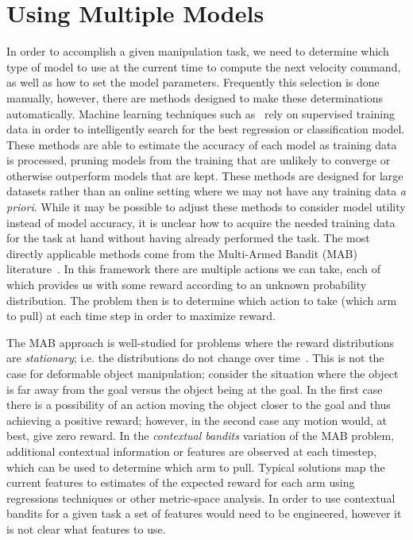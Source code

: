
\section{Using Multiple Models}

In order to accomplish a given manipulation task, we need to determine which type of model to use at the current time to compute the next velocity command, as well as how to set the model parameters. Frequently this selection is done manually, however, there are methods designed to make these determinations automatically. Machine learning techniques such as~\cite{Maron1994, Sparks2015} rely on supervised training data in order to intelligently search for the best regression or classification model. These methods are able to estimate the accuracy of each model as training data is processed, pruning models from the training that are unlikely to converge or otherwise outperform models that are kept. These methods are designed for large datasets rather than an online setting where we may not have any training data \textit{a priori}. While it may be possible to adjust these methods to consider model utility instead of model accuracy, it is unclear how to acquire the needed training data for the task at hand without having already performed the task. The most directly applicable methods come from the Multi-Armed Bandit (MAB) literature~\cite{Whittle1988, Auer2002, Gittins2011}. In this framework there are multiple actions we can take, each of which provides us with some reward according to an unknown probability distribution. The problem then is to determine which action to take (which arm to pull) at each time step in order to maximize reward.

The MAB approach is well-studied for problems where the reward distributions are \textit{stationary}; i.e. the distributions do not change over time~\cite{Auer2002, Agrawal2012}. This is not the case for deformable object manipulation; consider the situation where the object is far away from the goal versus the object being at the goal. In the first case there is a possibility of an action moving the object closer to the goal and thus achieving a positive reward; however, in the second case any motion would, at best, give zero reward. In the \textit{contextual bandits} \cite{Langford2008, Slivkins2014} variation of the MAB problem, additional contextual information or features are observed at each timestep, which can be used to determine which arm to pull. Typical solutions map the current features to estimates of the expected reward for each arm using regressions techniques or other metric-space analysis. In order to use contextual bandits for a given task a set of features would need to be engineered, however it is not clear what features to use.

